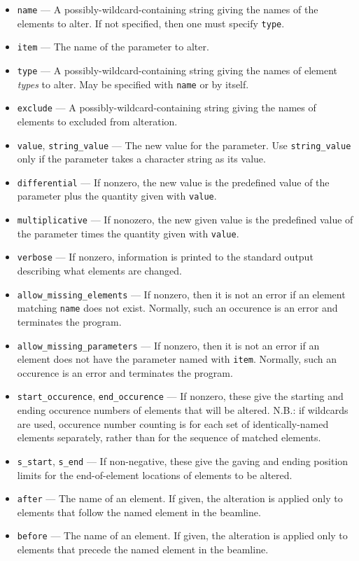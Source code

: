 \documentclass[11pt]{article}
\begin{document}
\begin{itemize}
\item \verb|name| --- A possibly-wildcard-containing string giving the names of the
        elements to alter.  If not specified, then one must specify \verb|type|.
\item \verb|item| --- The name of the parameter to alter.
\item \verb|type| --- A possibly-wildcard-containing string giving the names of element
        {\em types} to alter.  May be specified with \verb|name| or by itself.
\item \verb|exclude| --- A possibly-wildcard-containing string giving the names of elements
        to excluded from alteration.
\item \verb|value|, \verb|string_value| --- The new value for the parameter.  Use
      \verb|string_value| only if the parameter takes a character string as its value.
\item \verb|differential| --- If nonzero, the new value is 
        the predefined value of the parameter plus the quantity given with \verb|value|.
\item \verb|multiplicative| --- If nonozero, the new given value is the predefined
        value of the parameter times the quantity given with \verb|value|.
\item \verb|verbose| --- If nonzero, information is printed to the standard output describing
        what elements are changed.
\item \verb|allow_missing_elements| --- If nonzero, then it is not an error if an
        element matching \verb|name| does not exist.   Normally, such
        an occurence is an error and terminates the program.
\item \verb|allow_missing_parameters| --- If nonzero, then it is not an error if an
        element does not have the parameter named with \verb|item|.  Normally, such
        an occurence is an error and terminates the program.
\item \verb|start_occurence|, \verb|end_occurence| --- If nonzero, these give the starting and
 ending occurence numbers of elements that will be altered.  N.B.: if wildcards are used, occurence
 number counting is for each set of identically-named elements separately, rather than for the sequence
 of matched elements.
\item \verb|s_start|, \verb|s_end| --- If non-negative, these give the gaving and ending position
 limits for the end-of-element locations of elements to be altered.
\item \verb|after| --- The name of an element.  If given, the alteration is applied only to elements
 that follow the named element in the beamline.  
\item \verb|before| --- The name of an element.  If given, the alteration is applied only to elements
 that precede the named element in the beamline. 
\end{itemize}
\end{document}
